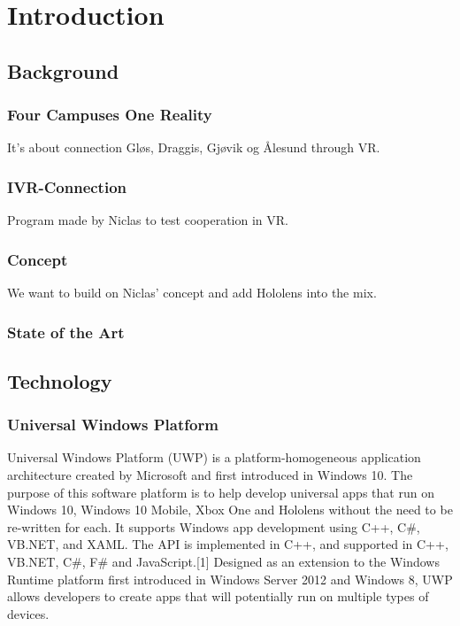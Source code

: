 \section{Introduction}

\subsection{Background}

    \subsubsection{Four Campuses One Reality}
    It's about connection Gløs, Draggis, Gjøvik og Ålesund through VR.

    \subsubsection{IVR-Connection}
    Program made by Niclas to test cooperation in VR.

    \subsubsection{Concept}
    We want to build on Niclas' concept and add Hololens into the mix.
    
    \subsubsection{State of the Art}

\subsection{Technology}

    \subsubsection{Universal Windows Platform}
    Universal Windows Platform (UWP) is a platform-homogeneous application architecture created by Microsoft and first introduced in Windows 10. The purpose of this software platform is to help develop universal apps that run on Windows 10, Windows 10 Mobile, Xbox One and Hololens without the need to be re-written for each. It supports Windows app development using C++, C#, VB.NET, and XAML. The API is implemented in C++, and supported in C++, VB.NET, C#, F# and JavaScript.[1] Designed as an extension to the Windows Runtime platform first introduced in Windows Server 2012 and Windows 8, UWP allows developers to create apps that will potentially run on multiple types of devices. %

